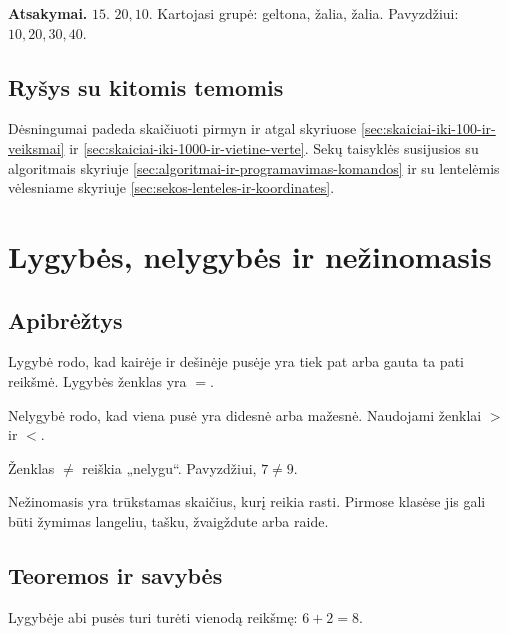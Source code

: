 \textbf{Atsakymai.} \(15\). \(20,10\). Kartojasi grupė: geltona, žalia, žalia. Pavyzdžiui: \(10,20,30,40\).

\subsection{Ryšys su kitomis temomis}

Dėsningumai padeda skaičiuoti pirmyn ir atgal skyriuose \ref{sec:skaiciai-iki-100-ir-veiksmai} ir \ref{sec:skaiciai-iki-1000-ir-vietine-verte}. Sekų taisyklės susijusios su algoritmais skyriuje \ref{sec:algoritmai-ir-programavimas-komandos} ir su lentelėmis vėlesniame skyriuje \ref{sec:sekos-lenteles-ir-koordinates}.

\section{Lygybės, nelygybės ir nežinomasis}\label{sec:lygybes-nelygybes-ir-nezinomasis}

\subsection{Apibrėžtys}

\begin{apibreztis}
Lygybė rodo, kad kairėje ir dešinėje pusėje yra tiek pat arba gauta ta pati reikšmė. Lygybės ženklas yra \(=\).
\end{apibreztis}

\begin{apibreztis}
Nelygybė rodo, kad viena pusė yra didesnė arba mažesnė. Naudojami ženklai \(>\) ir \(<\).
\end{apibreztis}

\begin{apibreztis}
Ženklas \(\neq\) reiškia „nelygu“. Pavyzdžiui, \(7\neq 9\).
\end{apibreztis}

\begin{apibreztis}
Nežinomasis yra trūkstamas skaičius, kurį reikia rasti. Pirmose klasėse jis gali būti žymimas langeliu, tašku, žvaigždute arba raide.
\end{apibreztis}

\subsection{Teoremos ir savybės}

\begin{savybe}
Lygybėje abi pusės turi turėti vienodą reikšmę: \(6+2=8\).
\end{savybe}

